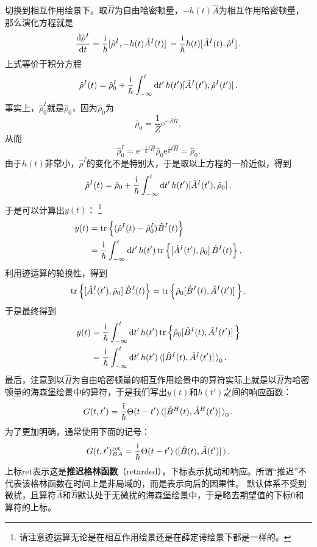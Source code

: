 \documentclass[hyperref, UTF8, a4paper]{ctexart}
\newcommand*{\ii}{\mathrm{i}}
\newcommand*{\ee}{\mathrm{e}}
\begin{document}
切换到相互作用绘景下。取$\hat{H}$为自由哈密顿量，$-h(t)\hat{A}$为相互作用哈密顿量，那么演化方程就是
\[
    \dv{\hat{\rho}^I}{t} = \frac{\ii}{\hbar} \comm*{\hat{\rho}^I}{-h(t)\hat{A}^I(t)} = \frac{\ii}{\hbar} h(t) \comm*{\hat{A}^I(t)}{\hat{\rho}^I}.
\]
上式等价于积分方程
\[
    \hat{\rho}^I(t) = \hat{\rho}_0^I + \frac{\ii}{\hbar}  \int_{-\infty}^t \dd{t'} h(t') \comm*{\hat{A}^I(t')}{\hat{\rho}^I(t')}.
\]
事实上，$\hat{\rho}_0^I$就是$\hat{\rho}_0$，因为$\hat{\rho}_0$为
\[
    \hat{\rho}_0 = \frac{1}{Z} \ee^{-\beta \hat{H}},
\]
从而
\[
    \hat{\rho}_0^I = \ee^{-\frac{\ii}{\hbar}t \hat{H}} \hat{\rho}_0 \ee^{\frac{\ii}{\hbar}t \hat{H}} = \hat{\rho}_0.
\]
由于$h(t)$非常小，$\hat{\rho}^I$的变化不是特别大，于是取以上方程的一阶近似，得到
\[
    \hat{\rho}^I(t) = \hat{\rho}_0 + \frac{\ii}{\hbar}  \int_{-\infty}^t \dd{t'} h(t') \comm*{\hat{A}^I(t')}{\hat{\rho}_0}.
\]
于是可以计算出$y(t)$：%
\footnote{请注意迹运算无论是在相互作用绘景还是在薛定谔绘景下都是一样的。}
\[
    \begin{aligned}
        y(t) &= \trace \left\{ (\hat{\rho}^I(t) - \hat{\rho}^I_0) \hat{B}^I(t) \right\} \\
        &= \frac{\ii}{\hbar} \int_{-\infty}^t \dd{t'} h(t') \trace \left\{ \comm*{\hat{A}^I(t')}{\hat{\rho}_0} \hat{B}^I(t) \right\},
    \end{aligned}
\]
利用迹运算的轮换性，得到
\[
    \trace \left\{ \comm*{\hat{A}^I(t')}{\hat{\rho}_0} \hat{B}^I(t) \right\} = \trace \left\{ \hat{\rho}_0 \comm*{\hat{B}^I(t)}{\hat{A}^I(t')} \right\},
\]
于是最终得到
\[
    \begin{aligned}
        y(t) &= \frac{\ii}{\hbar} \int_{-\infty}^t \dd{t'} h(t') \trace \left\{ \hat{\rho}_0 \comm*{\hat{B}^I(t)}{\hat{A}^I(t')} \right\} \\
        &= \frac{\ii}{\hbar} \int_{-\infty}^t \dd{t'} h(t') \expval*{\comm*{\hat{B}^I(t)}{\hat{A}^I(t')} }_0.
    \end{aligned}
\]
最后，注意到以$\hat{H}$为自由哈密顿量的相互作用绘景中的算符实际上就是以$\hat{H}$为哈密顿量的海森堡绘景中的算符，于是我们写出$y(t)$和$h(t')$之间的响应函数：
\[
    G(t,t') = \frac{\ii}{\hbar} \Theta(t-t') \expval*{\comm*{\hat{B}^H(t)}{\hat{A}^H(t')}}_0.
\]
为了更加明确，通常使用下面的记号：
\begin{equation}
    G(t,t')^\text{ret}_{BA} = \frac{\ii}{\hbar} \Theta(t-t') \expval*{\comm*{\hat{B}(t)}{\hat{A}(t')}}.
    \label{eq:retarded-green-function}
\end{equation}
上标ret表示这是\textbf{推迟格林函数}（retarded），下标表示扰动和响应。所谓“推迟”不代表该格林函数在时间上是非局域的，而是表示向后的因果性。
默认体系不受到微扰，且算符$\hat{A}$和$\hat{B}$默认处于无微扰的海森堡绘景中，于是略去期望值的下标0和算符的上标。
\end{document}
